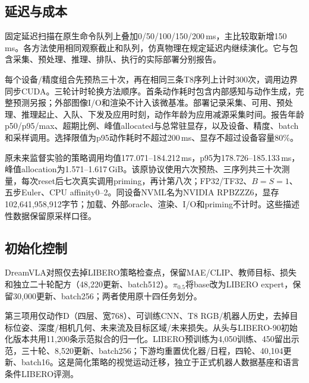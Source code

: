 \subsection{延迟与成本}
固定延迟扫描在原生命令队列上叠加0/50/100/150/200\,ms，主比较取新增150\,ms。各方法使用相同观察截止和队列，仿真物理在规定延迟内继续演化。它与包含采集、预处理、推理、排队、执行的实际部署分别报告。



每个设备/精度组合先预热三十次，再在相同三条T8序列上计时300次，调用边界同步CUDA。三轮计时轮换方法顺序。首条动作耗时包含内部感知与动作生成，完整预测另报；外部图像I/O和渲染不计入该微基准。部署记录采集、可用、预处理、推理起止、入队、下发及应用时刻，动作年龄为应用减源采集时间。报告年龄p50/p95/max、超期比例、峰值allocated与总常驻显存，以及设备、精度、batch和采样调用。选择限值为p95动作耗时不超过200\,ms、显存不超过设备容量80\%。

原未来监督实验的策略调用均值177.071--184.212\,ms，p95为178.726--185.133\,ms，峰值allocation为1.571--1.617\,GiB。该原协议使用六次预热、三序列共三十次测量，每次reset后七次真实调用priming，再计第八次；FP32/TF32、$B=S=1$、五步Euler、CPU affinity0--2。同设备NVML名为NVIDIA RPBZZZ6，显存102,641,958,912字节；加载、外部oracle、渲染、I/O和priming不计时。这些描述性数据保留原采样口径。

\subsection{初始化控制}
DreamVLA对照仅去掉LIBERO策略检查点，保留MAE/CLIP、教师目标、损失和独立二十轮配方（48,220更新、batch512）。$\pi_{0.5}$将base改为LIBERO expert，保留30,000更新、batch256；两者使用原十四任务划分。

第三项用仅动作D（四层、宽768）、可训练CNN、T8 RGB/机器人历史，去掉目标位姿、深度/相机几何、未来流及目标区域/未来损失。从头与LIBERO-90初始化版本共用11,200条示范拟合的归一化。LIBERO预训练为4,050训练、450留出示范，三十轮、8,520更新、batch256；下游均重置优化器/日程，四轮、40,104更新、batch16。这是简化策略的视觉运动迁移，独立于正式机器人数据基座和语言条件LIBERO评测。


\endgroup
